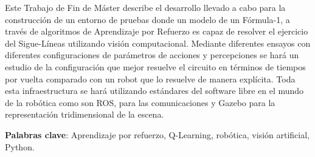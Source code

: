 Este Trabajo de Fin de Máster describe el desarrollo llevado a cabo para la construcción de un entorno de pruebas donde un modelo de un Fórmula-1, a través de algoritmos de Aprendizaje por Refuerzo es capaz de resolver el ejercicio del Sigue-Líneas utilizando visión computacional. Mediante diferentes ensayos con diferentes configuraciones de parámetros de acciones y percepciones se hará un estudio de la configuración que mejor resuelve el circuito en términos de tiempos por vuelta comparado con un robot que lo resuelve de manera explícita. Toda esta infraestructura se hará utilizando estándares del software libre en el mundo de la robótica como son ROS, para las comunicaciones y Gazebo para la representación tridimensional de la escena.

    \textbf{Palabras clave}: Aprendizaje por refuerzo, Q-Learning, robótica, visión artificial, Python.